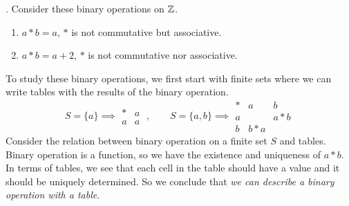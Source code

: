 \ex. Consider these binary operations on \(\mathbb{Z}\).
\begin{enumerate}
    \item \(a * b = a\), \(*\) is not commutative but associative.
    \item \(a * b = a + 2\), \(*\) is not commutative nor associative.
\end{enumerate}

\rmk To study these binary operations, we first start with finite sets where we can write tables with the results of the binary operation.
\[
    S = \{a\} \implies \begin{array}{c|c}
        * & a \\ \hline
        a & a
    \end{array}\;,
    \qquad
    S = \{a, b\} \implies
    \begin{array}{c|c|c}
        * & a     & b     \\ \hline
        a &       & a * b \\ \hline
        b & b * a &
    \end{array}
\]
Consider the relation between binary operation on a finite set \(S\) and tables. Binary operation is a function, so we have the existence and uniqueness of \(a * b\). In terms of tables, we see that each cell in the table should have a value and it should be uniquely determined. So we conclude that \textit{we can describe a binary operation with a table}.

\pagebreak
